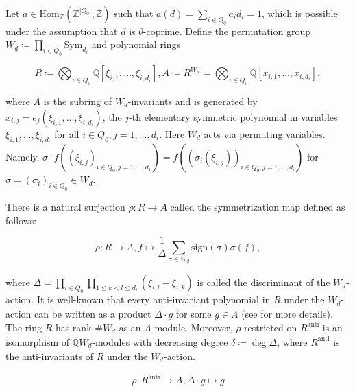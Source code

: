 \documentclass[11pt]{article}
\begin{document}
Let \(a\in \mathrm{Hom}_{\mathbb{Z}}(\mathbb{Z}^{|Q_0|}, \mathbb{Z})\) such that \(a(\underline{d}) = \sum_{i\in Q_0}a_i d_i = 1\), which is possible under the assumption that \(\underline{d}\) is \(\theta\)-coprime. Define the permutation group \(W_{\underline{d}} \coloneqq \prod_{i\in Q_0}\text{Sym}_{d_i}\) and polynomial rings 

\[
R \coloneqq \bigotimes_{i\in Q_0}\mathbb{Q}[\xi_{i, 1}, \dots, \xi_{i, d_i}], A\coloneqq R^{W_{\underline{d}}} = \bigotimes_{i\in Q_0}\mathbb{Q}[x_{i, 1}, \dots, x_{i, d_i}],
\]

where \(A\) is the subring of \(W_{\underline{d}}\)-invariants and is generated by \(x_{i,j} = e_j(\xi_{i, 1}, \dots, \xi_{i, d_i})\), the \(j\)-th elementary symmetric polynomial in variables \(\xi_{i, 1}, \dots, \xi_{i, d_i}\) for all \(i\in Q_0, j = 1, \dots, d_i\). Here \(W_{\underline{d}}\) acts via permuting variables. Namely, \(\sigma \cdot f((\xi_{i, j})_{i\in Q_0, j = 1, \dots, d_1}) = f((\sigma_i(\xi_{i, j}))_{i\in Q_0, j = 1, \dots, d_i}) \) for \(\sigma = (\sigma_i)_{i\in Q_0}\in W_{\underline{d}}\). 

There is a natural surjection \(\rho\colon R\rightarrow A\) called the symmetrization map defined as follows:

\begin{equation}
    \rho: R \rightarrow A, f \mapsto \frac{1}{\Delta}\sum_{\sigma\in W_{\underline{d}}}\text{sign}(\sigma)\sigma(f),\label{Map:symmetrization}
\end{equation}

where \(\Delta = \prod_{i\in Q_0}\prod_{1\leqslant k < l\leqslant d_i}(\xi_{i, l} - \xi_{i, k})\) is called the discriminant of the \(W_{\underline{d}}\)-action. It is well-known that every anti-invariant polynomial in \(R\) under the \(W_{\underline{d}}\)-action can be written as a product \(\Delta\cdot g\) for some \(g\in A\) (see \cite[Chapter , \S 5, Proposition 5]{bourbaki1994lie} for more details). The ring \(R\) has rank \(\# W_{\underline{d}}\) as an \(A\)-module. Moreover, \(\rho\) restricted on \(R^{\text{anti}}\) is an isomorphism of \(\mathbb{Q}W_{\underline{d}}\)-modules with decreasing degree \(\delta\coloneqq \deg \Delta\), where \(R^{\text{anti}}\) is the anti-invariants of \(R\) under the \(W_{\underline{d}}\)-action. 

\begin{equation}
    \rho: R^{\text{anti}}\rightarrow A, \Delta \cdot g\mapsto g\label{Map:restricted-rho}
\end{equation}
\end{document}

